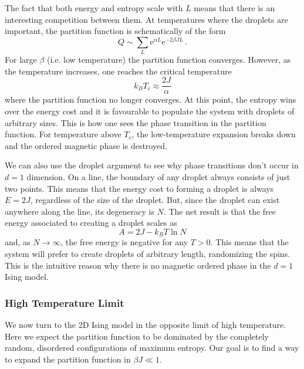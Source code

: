 \documentclass{article}
\theoremstyle{plain}\theoremheaderfont{\normalfont\bfseries}\theorembodyfont{\rmfamily}\theoremseparator{.}\newtheorem*{thm}{Theorem}\newtheorem*{law}{Law}\newtheorem*{pos}{Postulate}
\numberwithin{equation}{section}
\newcommand{\ee}{\mathrm{e}}
\begin{document}
    The fact that both energy and entropy scale with \(L\) means that there is an interesting competition between them. At temperatures where the droplets are important, the partition function is schematically of the form
    \begin{equation}
        Q\sim \sum_L \ee^{\alpha L}\ee^{-2\beta JL}\,.
    \end{equation}
    For large \(\beta\) (i.e. low temperature) the partition function converges. However, as the temperature increases, one reaches the critical temperature
    \begin{equation}\label{peierls_droplets_tc}
        k_B T_c\approx\frac{2J}{\alpha}
    \end{equation}
    where the partition function no longer converges. At this point, the entropy wins over the energy cost and it is favourable to populate the system with droplets of arbitrary sizes. This is how one sees the phase transition in the partition function. For temperature above \(T_c\), the low-temperature expansion breaks down and the ordered magnetic phase is destroyed.

    We can also use the droplet argument to see why phase transitions don't occur in \(d=1\) dimension. On a line, the boundary of any droplet always consists of just two points. This means that the energy cost to forming a droplet is always \(E=2J\), regardless of the size of the droplet. But, since the droplet can exist anywhere along the line, its degeneracy is \(N\). The net result is that the free energy associated to creating a droplet scales as
    \begin{equation}
        A=2J-k_B T\ln N
    \end{equation}
    and, as \(N\to\infty\), the free energy is negative for any \(T>0\). This means that the system will prefer to create droplets of arbitrary length, randomizing the spins. This is the intuitive reason why there is no magnetic ordered phase in the \(d=1\) Ising model.

    \subsubsection{High Temperature Limit}
    We now turn to the 2D Ising model in the opposite limit of high temperature. Here we expect the partition function to be dominated by the completely random, disordered configurations of maximum entropy. Our goal is to find a way to expand the partition function in \(\beta J\ll 1\).
\end{document}
